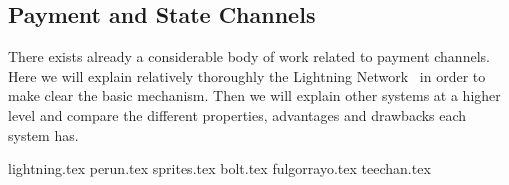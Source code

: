 \subsection{Payment and State Channels}
\label{sec:literaturereview:channels}
  There exists already a considerable body of work related to payment channels. Here we
  will explain relatively thoroughly the Lightning Network~\cite{lightning} in order to
  make clear the basic mechanism. Then we will explain other systems at a higher level and
  compare the different properties, advantages and drawbacks each system has.

  {lightning.tex}
  {perun.tex}
  {sprites.tex}
  {bolt.tex}
  {fulgorrayo.tex}
  {teechan.tex}
